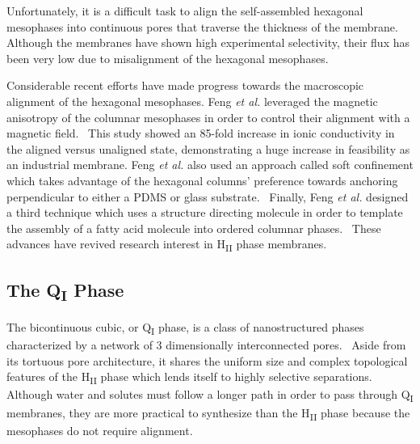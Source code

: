   Unfortunately, it is a difficult task to align the self-assembled hexagonal
  mesophases into continuous pores that traverse the thickness of the membrane.
  Although the membranes have shown high experimental selectivity, their flux has been
  very low due to misalignment of the hexagonal mesophases.~\cite{zhou_supported_2005}
  
  Considerable recent efforts have made progress towards the macroscopic
  alignment of the hexagonal mesophases. Feng \textit{et al.} leveraged the magnetic 
  anisotropy of the columnar mesophases in order to control their alignment with a 
  magnetic field.~\cite{feng_scalable_2014} This study showed an 85-fold increase in
  ionic conductivity in the aligned versus unaligned state, demonstrating a huge 
  increase in feasibility as an industrial membrane. Feng \textit{et al.} also used
  an approach called soft confinement which takes advantage of the hexagonal columns'
  preference towards anchoring perpendicular to either a PDMS or glass substrate.~\cite{feng_thin_2016}
  Finally, Feng \textit{et al.} designed a third technique which uses a structure
  directing molecule in order to template the assembly of a fatty acid 
  molecule into ordered columnar phases.~\cite{feng_highly_2017} These advances 
  have revived research interest in H\textsubscript{II} phase membranes.
  
  \subsection{The Q\textsubscript{I} Phase}
  
  The bicontinuous cubic, or Q\textsubscript{I} phase, is a class of nanostructured
  phases characterized by a network of 3 dimensionally interconnected pores.~\cite{hyde_bicontinuous_1996}
  Aside from its tortuous pore architecture, it shares the uniform size and complex 
  topological features of the H\textsubscript{II} phase which lends itself to highly
  selective separations. Although water and solutes must follow a longer path in order
  to pass through Q\textsubscript{I} membranes, they are more practical to synthesize
  than the H\textsubscript{II} phase because the mesophases do not require alignment.~\cite{zhou_new_2007}
  
  
